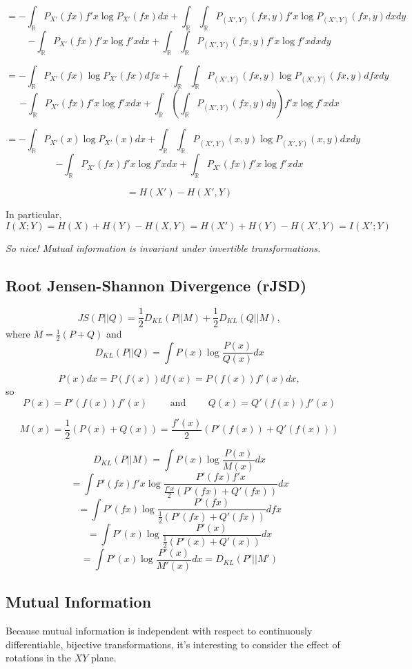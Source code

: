 \documentclass[12pt]{article}
\newcommand{\R}{\mathbb{R}}
\begin{document}
$$= -\int_{\R}P_{X'}(fx) f'x \log P_{X'}(fx) dx + \int_{\R}\int_{\R}P_{(X',Y)}(fx,y)f'x\log P_{(X',Y)}(fx,y)dxdy$$
$$-\int_{\R}P_{X'}(fx) f'x \log f'x dx  + \int_{\R}\int_{\R}P_{(X',Y)}(fx,y)f'x \log f'x dxdy$$

$$= -\int_{\R}P_{X'}(fx) \log P_{X'}(fx) dfx + \int_{\R}\int_{\R}P_{(X',Y)}(fx,y)\log P_{(X',Y)}(fx,y)dfxdy$$
$$-\int_{\R}P_{X'}(fx) f'x \log f'x dx  + \int_{\R}\left(\int_{\R}P_{(X',Y)}(fx,y)dy\right)f'x \log f'x dx$$

$$= -\int_{\R}P_{X'}(x) \log P_{X'}(x) dx + \int_{\R}\int_{\R}P_{(X',Y)}(x,y)\log P_{(X',Y)}(x,y)dxdy$$
$$-\int_{\R}P_{X'}(fx) f'x \log f'x dx  + \int_{\R}P_{X'}(fx)f'x \log f'x dx$$

$$= H(X') - H(X', Y)$$

In particular,
$$I(X;Y) = H(X) + H(Y) - H(X,Y) = H(X') + H(Y) - H(X',Y) = I(X';Y)$$

\begin{center}
\it So nice! Mutual information is invariant under invertible transformations.
\end{center}

\newpage

\subsection*{Root Jensen-Shannon Divergence (rJSD)}

$$JS(P||Q) =\frac{1}{2}D_{KL}(P||M) + \frac{1}{2}D_{KL}(Q||M),$$
where $M = \frac{1}{2}(P+Q)$ and
$$D_{KL}(P||Q) = \int P(x) \log \frac{P(x)}{Q(x)}dx$$

$$P(x)dx = P(f(x))df(x) = P(f(x))f'(x) dx,$$
so
$$P(x) = P'(f(x))f'(x) \qquad\text{ and }\qquad Q(x) = Q'(f(x))f'(x)$$

$$M(x) = \frac{1}{2}(P(x)+Q(x)) = \frac{f'(x)}{2}(P'(f(x)) + Q'(f(x)))$$

$$D_{KL}(P||M) = \int P(x)\log\frac{P(x)}{M(x)}dx$$
$$= \int P'(fx)f'x\log\frac{P'(fx)f'x}{\frac{f'x}{2}(P'(fx) + Q'(fx))}dx$$
$$= \int P'(fx)\log\frac{P'(fx)}{\frac{1}{2}(P'(fx) + Q'(fx))}dfx$$
$$= \int P'(x)\log\frac{P'(x)}{\frac{1}{2}(P'(x) + Q'(x))}dx$$
$$= \int P'(x)\log\frac{P'(x)}{M'(x)}dx = D_{KL}(P'||M')$$

\subsection*{Mutual Information}

Because mutual information is independent with respect to continuously differentiable, bijective transformations, it's interesting to consider the effect of rotations in the $XY$ plane.
\end{document}
